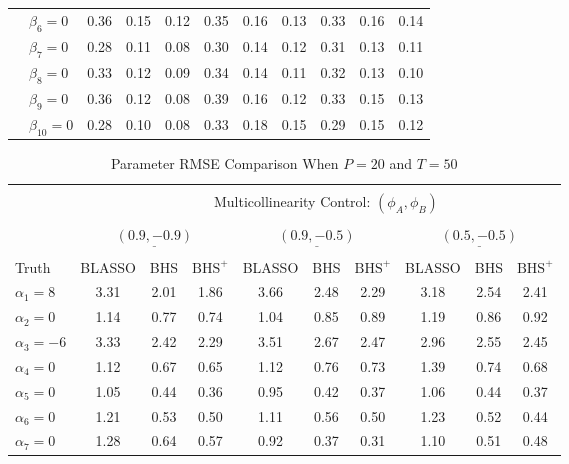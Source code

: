 \begin{table}[htbp]
\begin{tabular}{ll|ccc|ccc|ccc}
  & $\beta_6=0$ & 0.36 & 0.15 & 0.12 & 0.35 & 0.16 & 0.13 & 0.33 & 0.16 & 0.14 \\ 
  & $\beta_7=0$ & 0.28 & 0.11 & 0.08 & 0.30 & 0.14 & 0.12 & 0.31 & 0.13 & 0.11 \\ 
  & $\beta_8=0$ & 0.33 & 0.12 & 0.09 & 0.34 & 0.14 & 0.11 & 0.32 & 0.13 & 0.10 \\ 
  & $\beta_9=0$ & 0.36 & 0.12 & 0.08 & 0.39 & 0.16 & 0.12 & 0.33 & 0.15 & 0.13 \\ 
  & $\beta_{10}=0$ & 0.28 & 0.10 & 0.08 & 0.33 & 0.18 & 0.15 & 0.29 & 0.15 & 0.12 \\ 
   \hline
\end{tabular}
\label{tab:rmseP10}
\end{table}

\begin{table}[htbp]
\scriptsize
\centering
\caption{Parameter RMSE Comparison When $P=20$ and $T=50$}
\begin{tabular}{l|ccc|ccc|ccc}
  \hline
  \multicolumn{1}{c|}{} & \multicolumn{9}{c}{}\\
  & & \multicolumn{7}{c}{Multicollinearity Control: $(\phi_A,\phi_B)$} &  \\
  \multicolumn{1}{c|}{} & \multicolumn{9}{c}{}\\
    & \multicolumn{3}{c}{$\underline{(0.9 ,-0.9)} $} & \multicolumn{3}{c}{$\underline{(0.9 ,-0.5)} $} & \multicolumn{3}{c}{$\underline{(0.5 ,-0.5)} $}   \\
  \multicolumn{1}{c|}{} & \multicolumn{9}{c}{}\\
 Truth & BLASSO & BHS & $\textrm{BHS}^+$ & BLASSO & BHS & $\textrm{BHS}^+$ & BLASSO & BHS & $\textrm{BHS}^+$ \\ 
\hline
  $\alpha_1=8$ & 3.31 & 2.01 & 1.86 & 3.66 & 2.48 & 2.29 & 3.18 & 2.54 & 2.41 \\ 
  $\alpha_2=0$ & 1.14 & 0.77 & 0.74 & 1.04 & 0.85 & 0.89 & 1.19 & 0.86 & 0.92 \\ 
  $\alpha_3=-6$ & 3.33 & 2.42 & 2.29 & 3.51 & 2.67 & 2.47 & 2.96 & 2.55 & 2.45 \\ 
  $\alpha_4=0$ & 1.12 & 0.67 & 0.65 & 1.12 & 0.76 & 0.73 & 1.39 & 0.74 & 0.68 \\ 
  $\alpha_5=0$ & 1.05 & 0.44 & 0.36 & 0.95 & 0.42 & 0.37 & 1.06 & 0.44 & 0.37 \\ 
  $\alpha_6=0$ & 1.21 & 0.53 & 0.50 & 1.11 & 0.56 & 0.50 & 1.23 & 0.52 & 0.44 \\ 
  $\alpha_7=0$ & 1.28 & 0.64 & 0.57 & 0.92 & 0.37 & 0.31 & 1.10 & 0.51 & 0.48 \\ 

\end{tabular}
\end{table}
